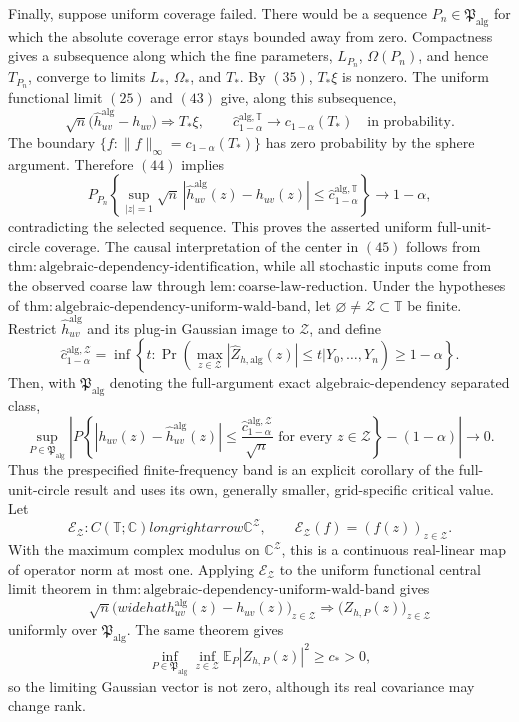 Finally, suppose uniform coverage failed.  There would be a sequence \(P_n\in\mathfrak P_{\mathrm{alg}}\) for which the absolute coverage error stays bounded away from zero.  Compactness gives a subsequence along which the fine parameters, \(L_{P_n}\), \(\Omega(P_n)\), and hence \(T_{P_n}\), converge to limits \(L_*\), \(\Omega_*\), and \(T_*\).  By \((35)\), \(T_*\xi\) is nonzero.  The uniform functional limit \((25)\) and \((43)\) give, along this subsequence,
\[
 \sqrt n\bigl(\widehat h_{uv}^{\mathrm{alg}}-h_{uv}\bigr)
 \Longrightarrow T_*\xi,
 \qquad
 \widehat c_{1-\alpha}^{\mathrm{alg},\mathbb T}
 \longrightarrow c_{1-\alpha}(T_*)
 \quad\text{in probability}.
\tag{44}
\]
The boundary \(\{f:\|f\|_\infty=c_{1-\alpha}(T_*)\}\) has zero probability by the sphere argument.  Therefore \((44)\) implies
\[
 P_{P_n}\!\left\{
  \sup_{|z|=1}\sqrt n\,
  |\widehat h_{uv}^{\mathrm{alg}}(z)-h_{uv}(z)|
  \le\widehat c_{1-\alpha}^{\mathrm{alg},\mathbb T}
 \right\}\longrightarrow1-\alpha,
\tag{45}
\]
contradicting the selected sequence.  This proves the asserted uniform full-unit-circle coverage.  The causal interpretation of the center in \((45)\) follows from \(\mathrm{thm{:}algebraic\mbox{-}dependency\mbox{-}identification}\), while all stochastic inputs come from the observed coarse law through \(\mathrm{lem{:}coarse\mbox{-}law\mbox{-}reduction}\).
Under the hypotheses of \(\mathrm{thm{:}algebraic\mbox{-}dependency\mbox{-}uniform\mbox{-}wald\mbox{-}band}\), let \(\varnothing\ne\mathcal Z\subset\mathbb T\) be finite.  Restrict \(\widehat h_{uv}^{\mathrm{alg}}\) and its plug-in Gaussian image to \(\mathcal Z\), and define
\[
 \widehat c_{1-\alpha}^{\mathrm{alg},\mathcal Z}
 =\inf\left\{t:
 \Pr\!\left(
  \max_{z\in\mathcal Z}|\widehat Z_{h,\mathrm{alg}}(z)|\le t
  \mathrel{\big|}Y_0,\ldots,Y_n
 \right)\ge1-\alpha\right\}.
\]
Then, with \(\mathfrak P_{\mathrm{alg}}\) denoting the full-argument exact algebraic-dependency separated class,
\[
 \sup_{P\in\mathfrak P_{\mathrm{alg}}}
 \left|
 P\!\left\{
  |h_{uv}(z)-\widehat h_{uv}^{\mathrm{alg}}(z)|
  \le\frac{\widehat c_{1-\alpha}^{\mathrm{alg},\mathcal Z}}{\sqrt n}
  \text{ for every }z\in\mathcal Z
 \right\}-(1-\alpha)
 \right|\longrightarrow0.
\]
Thus the prespecified finite-frequency band is an explicit corollary of the full-unit-circle result and uses its own, generally smaller, grid-specific critical value.
Let
\[
 \mathcal E_{\mathcal Z}:C(\mathbb T;\mathbb C)longrightarrow\mathbb C^{\mathcal Z},
 \qquad
 \mathcal E_{\mathcal Z}(f)=(f(z))_{z\in\mathcal Z}.
\]
With the maximum complex modulus on \(\mathbb C^{\mathcal Z}\), this is a continuous real-linear map of operator norm at most one.  Applying \(\mathcal E_{\mathcal Z}\) to the uniform functional central limit theorem in \(\mathrm{thm{:}algebraic\mbox{-}dependency\mbox{-}uniform\mbox{-}wald\mbox{-}band}\) gives
\[
 \sqrt n\bigl(widehat h_{uv}^{\mathrm{alg}}(z)-h_{uv}(z)\bigr)_{z\in\mathcal Z}
 \Longrightarrow
 \bigl(Z_{h,P}(z)\bigr)_{z\in\mathcal Z}
\tag{1}
\]
uniformly over \(\mathfrak P_{\mathrm{alg}}\).  The same theorem gives
\[
 \inf_{P\in\mathfrak P_{\mathrm{alg}}}
 \inf_{z\in\mathcal Z}\mathbb E_P|Z_{h,P}(z)|^2\ge c_*>0,
\tag{2}
\]
so the limiting Gaussian vector is not zero, although its real covariance may change rank.

